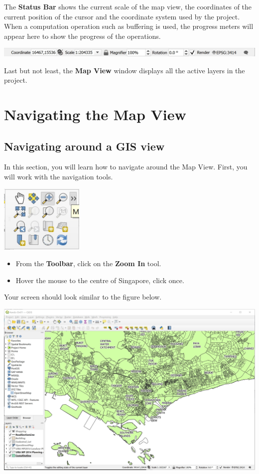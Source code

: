 \documentclass[
  letterpaper,
  DIV=11,
  numbers=noendperiod]{scrreprt}
\providecommand{\tightlist}{%
  \setlength{\itemsep}{0pt}\setlength{\parskip}{0pt}}\usepackage{longtable,booktabs,array}
\begin{document}
The \textbf{Status Bar} shows the current scale of the map view, the
coordinates of the current position of the cursor and the coordinate
system used by the project. When a computation operation such as
buffering is used, the progress meters will appear here to show the
progress of the operations.

\includegraphics{./img/image1-12.jpg}

Last but not least, the \textbf{Map View} window displays all the active
layers in the project.

\hypertarget{navigating-the-map-view}{%
\section{Navigating the Map View}\label{navigating-the-map-view}}

\hypertarget{navigating-around-a-gis-view}{%
\subsection{Navigating around a GIS
view}\label{navigating-around-a-gis-view}}

In this section, you will learn how to navigate around the Map View.
First, you will work with the navigation tools.

\includegraphics[width=0.3\textwidth,height=\textheight]{./img/image1-13.jpg}

\begin{itemize}
\tightlist
\item
  From the \textbf{Toolbar}, click on the \textbf{Zoom In} tool.
\item
  Hover the mouse to the centre of Singapore, click once.
\end{itemize}

Your screen should look similar to the figure below.

\includegraphics{./img/image1-14.jpg}
\end{document}
